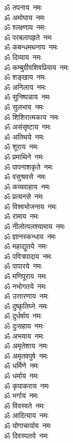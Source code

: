 \begin{multicols}{2}
\begin{flushleft}
ॐ तपनाय~नमः\\
ॐ अमोघाय~नमः\\
ॐ श्लक्ष्णाय~नमः\\
ॐ परबलापहृते~नमः\\
ॐ कबन्धमथनाय~नमः\hfill{}\\
ॐ दिव्याय~नमः\\
ॐ कम्बुग्रीवशिवप्रियाय~नमः\\
ॐ शङ्खाय~नमः\\
ॐ अनिलाय~नमः\\
ॐ सुनिष्पन्नाय~नमः\\
ॐ सुलभाय~नमः\\
ॐ शिशिरात्मकाय~नमः\\
ॐ असंसृष्टाय~नमः\\
ॐ अतिथये~नमः\\
ॐ शूराय~नमः\hfill{}\\
ॐ प्रमाथिने~नमः\\
ॐ पापनाशकृते~नमः\\
ॐ वसुश्रवसे~नमः\\
ॐ कव्यवाहाय~नमः\\
ॐ प्रत्यनसे~नमः\\
ॐ विश्वभोजनाय~नमः\\
ॐ रामाय~नमः\\
ॐ नीलोत्पलश्यामाय~नमः\\
ॐ ज्ञानस्कन्धाय~नमः\\
ॐ महाद्युतये~नमः\hfill{}\\
ॐ पवित्रपादाय~नमः\\
ॐ पापारये~नमः\\
ॐ मणिपूराय~नमः\\
ॐ नभोगतये~नमः\\
ॐ उत्तारणाय~नमः\\
ॐ दुष्कृतिघ्ने~नमः\\
ॐ दुर्धर्षाय~नमः\\
ॐ दुःसहाय~नमः\\
ॐ अभयाय~नमः\\
ॐ अमृतेशाय~नमः\hfill{}\\
ॐ अमृतवपुषे~नमः\\
ॐ धर्मिणे~नमः\\
ॐ धर्माय~नमः\\
ॐ कृपाकराय~नमः\\
ॐ भर्गाय~नमः\\
ॐ विवस्वते~नमः\\
ॐ आदित्याय~नमः\\
ॐ योगाचार्याय~नमः\\
ॐ दिवस्पतये~नमः\\

\end{flushleft}
\end{multicols}
